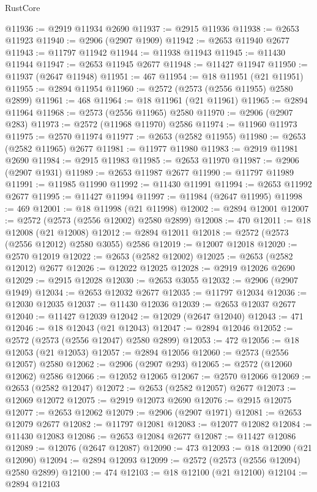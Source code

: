 \begin{lexlean}{RustCore}
\begin{coremodule}
@11936 := @2919 @11934 @2690
@11937 := @2915 @11936
@11938 := @2653 @11923
@11940 := @2906 (@2907 @1909)
@11942 := @2653 @11940 @2677
@11943 := @11797 @11942
@11944 := @11938 @11943
@11945 := @11430 @11944
@11947 := @2653 @11945 @2677
@11948 := @11427 @11947
@11950 := @11937 (@2647 @11948)
@11951 := 467
@11954 := @18 @11951 (@21 @11951)
@11955 := @2894 @11954
@11960 := @2572 (@2573 (@2556 @11955) @2580 @2899)
@11961 := 468
@11964 := @18 @11961 (@21 @11961)
@11965 := @2894 @11964
@11968 := @2573 (@2556 @11965) @2580
@11970 := @2906 (@2907 @283)
@11973 := @2572 (@11968 @11970) @2586
@11974 := @11960 @11973
@11975 := @2570 @11974
@11977 := @2653 (@2582 @11955)
@11980 := @2653 (@2582 @11965) @2677
@11981 := @11977 @11980
@11983 := @2919 @11981 @2690
@11984 := @2915 @11983
@11985 := @2653 @11970
@11987 := @2906 (@2907 @1931)
@11989 := @2653 @11987 @2677
@11990 := @11797 @11989
@11991 := @11985 @11990
@11992 := @11430 @11991
@11994 := @2653 @11992 @2677
@11995 := @11427 @11994
@11997 := @11984 (@2647 @11995)
@11998 := 469
@12001 := @18 @11998 (@21 @11998)
@12002 := @2894 @12001
@12007 := @2572 (@2573 (@2556 @12002) @2580 @2899)
@12008 := 470
@12011 := @18 @12008 (@21 @12008)
@12012 := @2894 @12011
@12018 := @2572 (@2573 (@2556 @12012) @2580 @3055) @2586
@12019 := @12007 @12018
@12020 := @2570 @12019
@12022 := @2653 (@2582 @12002)
@12025 := @2653 (@2582 @12012) @2677
@12026 := @12022 @12025
@12028 := @2919 @12026 @2690
@12029 := @2915 @12028
@12030 := @2653 @3055
@12032 := @2906 (@2907 @1949)
@12034 := @2653 @12032 @2677
@12035 := @11797 @12034
@12036 := @12030 @12035
@12037 := @11430 @12036
@12039 := @2653 @12037 @2677
@12040 := @11427 @12039
@12042 := @12029 (@2647 @12040)
@12043 := 471
@12046 := @18 @12043 (@21 @12043)
@12047 := @2894 @12046
@12052 := @2572 (@2573 (@2556 @12047) @2580 @2899)
@12053 := 472
@12056 := @18 @12053 (@21 @12053)
@12057 := @2894 @12056
@12060 := @2573 (@2556 @12057) @2580
@12062 := @2906 (@2907 @293)
@12065 := @2572 (@12060 @12062) @2586
@12066 := @12052 @12065
@12067 := @2570 @12066
@12069 := @2653 (@2582 @12047)
@12072 := @2653 (@2582 @12057) @2677
@12073 := @12069 @12072
@12075 := @2919 @12073 @2690
@12076 := @2915 @12075
@12077 := @2653 @12062
@12079 := @2906 (@2907 @1971)
@12081 := @2653 @12079 @2677
@12082 := @11797 @12081
@12083 := @12077 @12082
@12084 := @11430 @12083
@12086 := @2653 @12084 @2677
@12087 := @11427 @12086
@12089 := @12076 (@2647 @12087)
@12090 := 473
@12093 := @18 @12090 (@21 @12090)
@12094 := @2894 @12093
@12099 := @2572 (@2573 (@2556 @12094) @2580 @2899)
@12100 := 474
@12103 := @18 @12100 (@21 @12100)
@12104 := @2894 @12103

\end{coremodule}
\end{lexlean}
